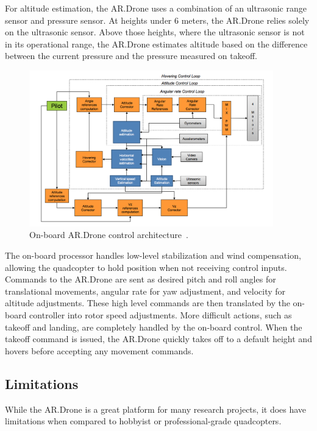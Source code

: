         For altitude estimation, the AR.Drone uses a combination of an ultrasonic range sensor and pressure sensor. At heights under 6 meters, the AR.Drone relies solely on the ultrasonic sensor. Above those heights, where the ultrasonic sensor is not in its operational range, the AR.Drone estimates altitude based on the difference between the current pressure and the pressure measured on takeoff. 

        \begin{figure}[ht]
            \centering
            \includegraphics[width=400px]{../images/control.png}
            \caption{On-board AR.Drone control architecture~\cite{Bristeau}.}\label{fig:control}
        \end{figure}

        The on-board processor handles low-level stabilization and wind compensation, allowing the quadcopter to hold position when not receiving control inputs. Commands to the AR.Drone are sent as desired pitch and roll angles for translational movements, angular rate for yaw adjustment, and velocity for altitude adjustments. These high level commands are then translated by the on-board controller into rotor speed adjustments. More difficult actions, such as takeoff and landing, are completely handled by the on-board control. When the takeoff command is issued, the AR.Drone quickly takes off to a default height and hovers before accepting any movement commands.



    \subsection{Limitations}

        While the AR.Drone is a great platform for many research projects, it does have limitations when compared to hobbyist or professional-grade quadcopters.

